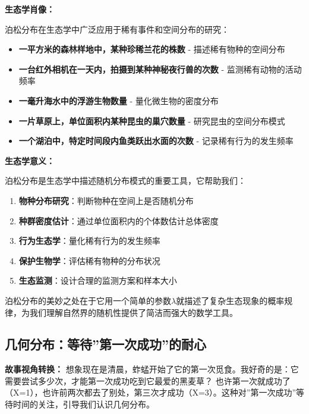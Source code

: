 \documentclass[
]{book}
\providecommand{\tightlist}{%
  \setlength{\itemsep}{0pt}\setlength{\parskip}{0pt}}
\begin{document}
\textbf{生态学肖像：}

泊松分布在生态学中广泛应用于稀有事件和空间分布的研究：

\begin{itemize}
\tightlist
\item
  \textbf{一平方米的森林样地中，某种珍稀兰花的株数} - 描述稀有物种的空间分布
\item
  \textbf{一台红外相机在一天内，拍摄到某种神秘夜行兽的次数} - 监测稀有动物的活动频率
\item
  \textbf{一毫升海水中的浮游生物数量} - 量化微生物的密度分布
\item
  \textbf{一片草原上，单位面积内某种昆虫的巢穴数量} - 研究昆虫的空间分布模式
\item
  \textbf{一个湖泊中，特定时间段内鱼类跃出水面的次数} - 记录稀有行为的发生频率
\end{itemize}

\textbf{生态学意义：}

泊松分布是生态学中描述随机分布模式的重要工具，它帮助我们：

\begin{enumerate}
\def\labelenumi{\arabic{enumi}.}
\tightlist
\item
  \textbf{物种分布研究}：判断物种在空间上是否随机分布
\item
  \textbf{种群密度估计}：通过单位面积内的个体数估计总体密度
\item
  \textbf{行为生态学}：量化稀有行为的发生频率
\item
  \textbf{保护生物学}：评估稀有物种的分布状况
\item
  \textbf{生态监测}：设计合理的监测方案和样本大小
\end{enumerate}

泊松分布的美妙之处在于它用一个简单的参数\(\lambda\)就描述了复杂生态现象的概率规律，为我们理解自然界的随机性提供了简洁而强大的数学工具。

\hypertarget{ux51e0ux4f55ux5206ux5e03ux7b49ux5f85ux7b2cux4e00ux6b21ux6210ux529fux7684ux8010ux5fc3}{%
\subsection{几何分布：等待''第一次成功''的耐心}\label{ux51e0ux4f55ux5206ux5e03ux7b49ux5f85ux7b2cux4e00ux6b21ux6210ux529fux7684ux8010ux5fc3}}

\textbf{故事视角转换：} 想象现在是清晨，蚱蜢开始了它的第一次觅食。我好奇的是：它需要尝试多少次，才能第一次成功吃到它最爱的黑麦草？ 也许第一次就成功了（X=1），也许前两次都去了别处，第三次才成功（X=3）。这种对''第一次成功''等待时间的关注，引导我们认识几何分布。
\end{document}
